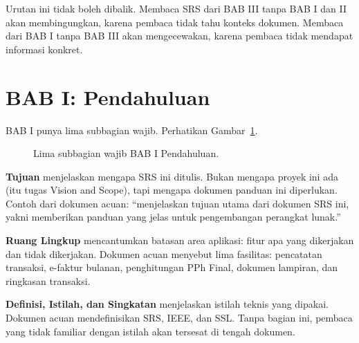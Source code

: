 \documentclass[11pt,a4paper]{article}
\begin{document}
Urutan ini tidak boleh dibalik. Membaca SRS dari BAB III tanpa BAB I dan II akan membingungkan, karena pembaca tidak tahu konteks dokumen. Membaca dari BAB I tanpa BAB III akan mengecewakan, karena pembaca tidak mendapat informasi konkret.

\section{BAB I: Pendahuluan}

BAB I punya lima subbagian wajib. Perhatikan Gambar~\ref{fig:bab-one}.

\begin{figure}[H]
	\centering
	\caption{Lima subbagian wajib BAB I Pendahuluan.}
	\label{fig:bab-one}
\end{figure}

\textbf{Tujuan} menjelaskan mengapa SRS ini ditulis. Bukan mengapa proyek ini ada (itu tugas Vision and Scope), tapi mengapa dokumen panduan ini diperlukan. Contoh dari dokumen acuan: ``menjelaskan tujuan utama dari dokumen SRS ini, yakni memberikan panduan yang jelas untuk pengembangan perangkat lunak.''

\textbf{Ruang Lingkup} mencantumkan batasan area aplikasi: fitur apa yang dikerjakan dan tidak dikerjakan. Dokumen acuan menyebut lima fasilitas: pencatatan transaksi, e-faktur bulanan, penghitungan PPh Final, dokumen lampiran, dan ringkasan transaksi.

\textbf{Definisi, Istilah, dan Singkatan} menjelaskan istilah teknis yang dipakai. Dokumen acuan mendefinisikan SRS, IEEE, dan SSL. Tanpa bagian ini, pembaca yang tidak familiar dengan istilah akan tersesat di tengah dokumen.
\end{document}
